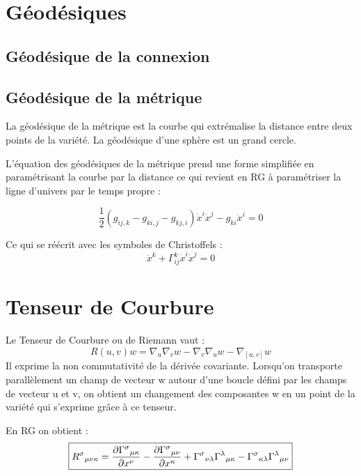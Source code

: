 \documentclass[10pt, a4paper]{report}
\numberwithin{equation}{subsection}
\begin{document}
\section{Géodésiques}
\subsection{Géodésique de la connexion}


\subsection{Géodésique de la métrique}
La géodésique de la métrique est la courbe qui extrémalise la distance entre deux points de la variété. La géodésique d'une sphère est un grand cercle.

L'équation des géodésiques de la métrique prend une forme simplifiée en paramétrisant la courbe par la distance ce qui revient en RG à paramétriser la ligne d'univers par le temps propre :

\begin{equation}
\boxed{\frac{1}{2} \left(g_{ij,k} - g_{ki,j} - g_{kj,i}\right)\dot{x}^i \dot{x}^j- g_{ki}\ddot{x}^i= 0}
\end{equation}

Ce qui se réécrit avec les symboles de Christoffels :
\begin{equation}
\boxed{\ddot{x}^k + \Gamma^k_{ij} \dot{x}^i\dot{x}^j=0}
\end{equation}



\section{Tenseur de Courbure}
Le Tenseur de Courbure ou de Riemann vaut : 
\begin{equation}
\boxed{ R(u,v)w =\nabla_u\nabla_v w - \nabla_v \nabla_u w -\nabla_{[u,v]} w }
\end{equation}
Il exprime la non commutativité de la dérivée covariante. Lorsqu'on transporte parallèlement un champ de vecteur w autour d'une boucle défini par les champs de vecteur u et v, on obtient un changement des composantes w en un point de la variété qui s'exprime grâce à ce tenseur.

En RG on obtient :
\begin{equation}
\boxed{{R^\sigma}_{\mu\nu\kappa} =
  {\partial{\Gamma^\sigma}_{\mu\kappa} \over \partial x^\nu} -
  {\partial{\Gamma^\sigma}_{\mu\nu} \over \partial x^\kappa} +
  {\Gamma^\sigma}_{\nu\lambda}{\Gamma^\lambda}_{\mu\kappa} -
  {\Gamma^\sigma}_{\kappa\lambda}{\Gamma^\lambda}_{\mu\nu}}
\end{equation}
\end{document}
